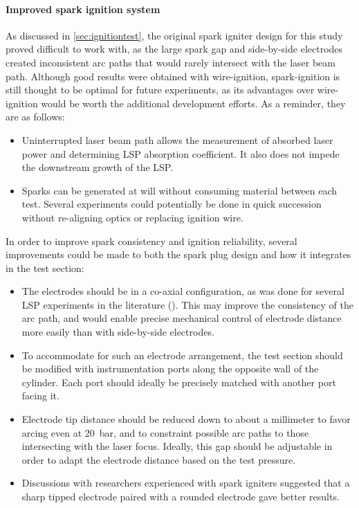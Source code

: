         \paragraph{Improved spark ignition system} As discussed in \autoref{sec:ignitiontest}, the original spark igniter design for this study proved difficult to work with, as the large spark gap and side-by-side electrodes created inconsistent arc paths that would rarely intersect with the laser beam path. Although good results were obtained with wire-ignition, spark-ignition is still thought to be optimal for future experiments, as its advantages over wire-ignition would be worth the additional development efforts. As a reminder, they are as follows:
        \begin{itemize}
            \item Uninterrupted laser beam path allows the measurement of absorbed laser power and determining LSP absorption coefficient. It also does not impede the downstream growth of the LSP.
            \item Sparks can be generated at will without consuming material between each test. Several experiments could potentially be done in quick succession without re-aligning optics or replacing ignition wire.
        \end{itemize}
        In order to improve spark consistency and ignition reliability, several improvements could be made to both the spark plug design and how it integrates in the test section:
        \begin{itemize}
            \item The electrodes should be in a co-axial configuration, as was done for several LSP experiments in the literature (\textcite{luCharacteristicDiagnosticsLaserStabilized2022, zimakovInteractionNearIRLaser2016,matsuiGeneratingConditionsArgon2019}). This may improve the consistency of the arc path, and would enable precise mechanical control of electrode distance more easily than with side-by-side electrodes.
            \item To accommodate for such an electrode arrangement, the test section should be modified with instrumentation ports along the opposite wall of the cylinder. Each port should ideally be precisely matched with another port facing it.
            \item Electrode tip distance should be reduced down to about a millimeter to favor arcing even at \qty{20}{bar}, and to constraint possible arc paths to those intersecting with the laser focus. Ideally, this gap should be adjustable in order to adapt the electrode distance based on the test pressure.
            \item Discussions with researchers experienced with spark igniters suggested that a sharp tipped electrode paired with a rounded electrode gave better results.
        \end{itemize}

